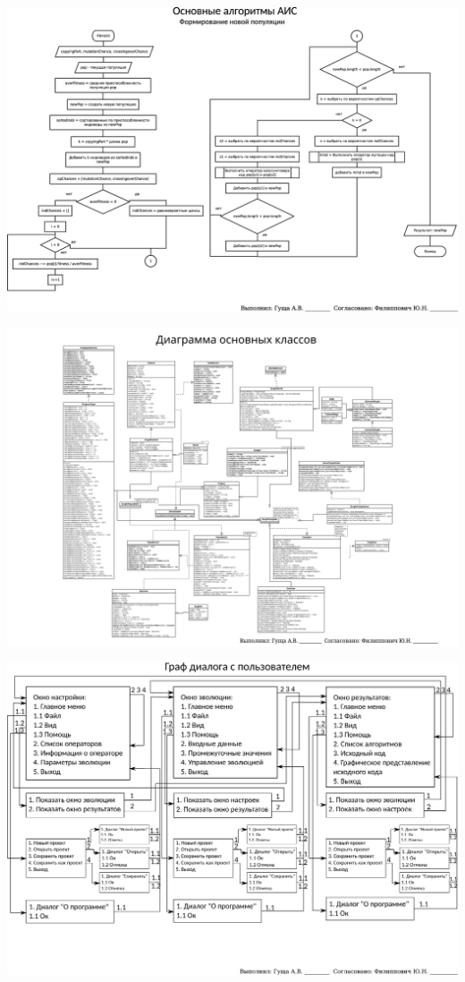 \documentclass[russian,utf8, a1paper, emptystyle]{eskdgraph}
\begin{document}
\begin{ESKDdrawing}
\includegraphics[scale=0.99]{list5_3}
\end{ESKDdrawing}

\begin{ESKDdrawing}
\includegraphics[scale=0.97]{list6}
\end{ESKDdrawing}

\begin{ESKDdrawing}
\includegraphics[scale=0.98]{list7}
\end{ESKDdrawing}
\end{document}
